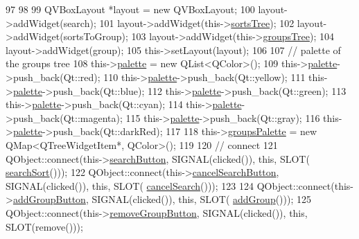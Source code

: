 \begin{DoxyCode}
97 
98 
99     QVBoxLayout *layout = \textcolor{keyword}{new} QVBoxLayout;
100     layout->addWidget(search);
101     layout->addWidget(this->\hyperlink{classTreeArea_ad323879d9e2e64b18dae18fe757b1b0e}{sortsTree});
102     layout->addWidget(sortsToGroup);
103     layout->addWidget(this->\hyperlink{classTreeArea_ab3cf8ca35655b0bace24a7c46170852f}{groupsTree});
104     layout->addWidget(group);
105     this->setLayout(layout);
106 
107     \textcolor{comment}{// palette of the groups tree}
108     this->\hyperlink{classTreeArea_a7e464d23da2120350b488e1828c13071}{palette} = \textcolor{keyword}{new} QList<QColor>();
109     this->\hyperlink{classTreeArea_a7e464d23da2120350b488e1828c13071}{palette}->push\_back(Qt::red);
110     this->\hyperlink{classTreeArea_a7e464d23da2120350b488e1828c13071}{palette}->push\_back(Qt::yellow);
111     this->\hyperlink{classTreeArea_a7e464d23da2120350b488e1828c13071}{palette}->push\_back(Qt::blue);
112     this->\hyperlink{classTreeArea_a7e464d23da2120350b488e1828c13071}{palette}->push\_back(Qt::green);
113     this->\hyperlink{classTreeArea_a7e464d23da2120350b488e1828c13071}{palette}->push\_back(Qt::cyan);
114     this->\hyperlink{classTreeArea_a7e464d23da2120350b488e1828c13071}{palette}->push\_back(Qt::magenta);
115     this->\hyperlink{classTreeArea_a7e464d23da2120350b488e1828c13071}{palette}->push\_back(Qt::gray);
116     this->\hyperlink{classTreeArea_a7e464d23da2120350b488e1828c13071}{palette}->push\_back(Qt::darkRed);
117 
118     this->\hyperlink{classTreeArea_a965d3a0fa45f6e31a50db967598f0f90}{groupsPalette} = \textcolor{keyword}{new} QMap<QTreeWidgetItem*, QColor>();
119 
120     \textcolor{comment}{// connect}
121     QObject::connect(this->\hyperlink{classTreeArea_a682ba9e29364cbfca7ad726a6a630907}{searchButton}, SIGNAL(clicked()), \textcolor{keyword}{this}, SLOT(
      \hyperlink{classTreeArea_aee1ca64b79821f9cbcc023861e169e33}{searchSort}()));
122     QObject::connect(this->\hyperlink{classTreeArea_a740ea34ee424f43171bcdd69125e515e}{cancelSearchButton}, SIGNAL(clicked()), \textcolor{keyword}{this}, SLOT(
      \hyperlink{classTreeArea_a4dc4bffd318bcf5a4023ec92a4932214}{cancelSearch}()));
123 
124     QObject::connect(this->\hyperlink{classTreeArea_a6e20bfd0bba99c036d7909d246a3fffa}{addGroupButton}, SIGNAL(clicked()), \textcolor{keyword}{this}, SLOT(
      \hyperlink{classTreeArea_a1825d29fa6bd5fbf4e8c0a4f657284bd}{addGroup}()));
125     QObject::connect(this->\hyperlink{classTreeArea_ab1bb8dfaad1425a3b1fcd48f75f140f2}{removeGroupButton}, SIGNAL(clicked()), \textcolor{keyword}{this}, SLOT(\textcolor{keyword}{remove}()));

\end{DoxyCode}
